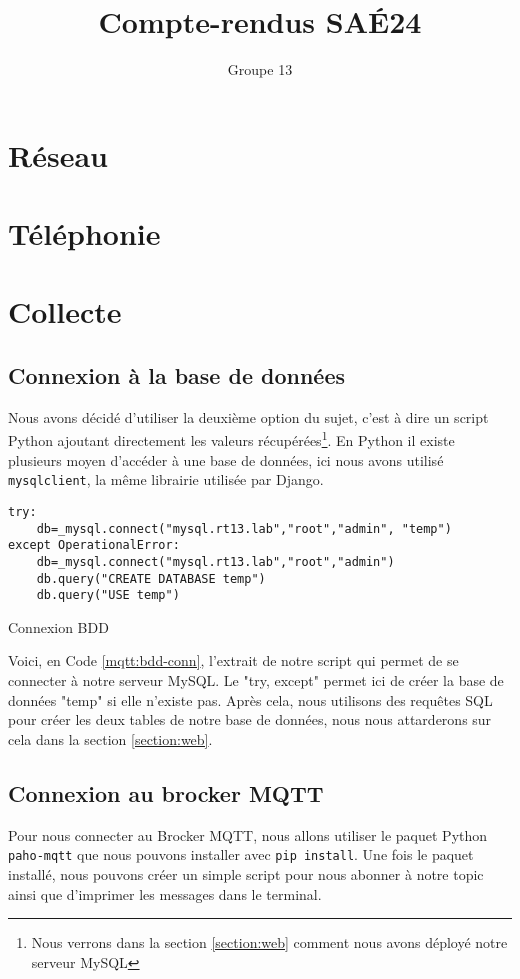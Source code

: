 \documentclass{article}
\author{Groupe 13}
\title{Compte-rendus SAÉ24}
\begin{document}
\maketitle
\tableofcontents
\newpage
\listoffigures
\newpage
\listoflistings

\newpage
\section{Réseau}

\newpage
\section{Téléphonie}

\newpage
\section{Collecte}
    \subsection{Connexion à la base de données}
    Nous avons décidé d'utiliser la deuxième option du sujet, c'est à dire un script Python ajoutant directement les valeurs récupérées\footnote{Nous verrons dans la section \ref{section:web} comment nous avons déployé notre serveur MySQL}. 
    En Python il existe plusieurs moyen d'accéder à une base de données, ici nous avons utilisé \verb|mysqlclient|, la même librairie utilisée par Django.
    \begin{listing}[H]
        \begin{verbatim}
try:
    db=_mysql.connect("mysql.rt13.lab","root","admin", "temp")
except OperationalError:
    db=_mysql.connect("mysql.rt13.lab","root","admin")
    db.query("CREATE DATABASE temp")
    db.query("USE temp")
        \end{verbatim}
        \caption{Connexion BDD}
        \label{mqtt:bdd-conn}
    \end{listing}
    Voici, en Code \ref{mqtt:bdd-conn}, l'extrait de notre script qui permet de se connecter à notre serveur MySQL. Le "try, except" permet ici de créer la base de données "temp" si elle n'existe pas. Après cela, nous utilisons des requêtes SQL pour créer les deux tables de notre base de données, nous nous attarderons sur cela dans la section \ref{section:web}.
    \subsection{Connexion au brocker MQTT}
    Pour nous connecter au Brocker MQTT, nous allons utiliser le paquet Python \verb|paho-mqtt| que nous pouvons installer avec \verb|pip install|.
    Une fois le paquet installé, nous pouvons créer un simple script pour nous abonner à notre topic ainsi que d'imprimer les messages dans le terminal.
\end{document}
